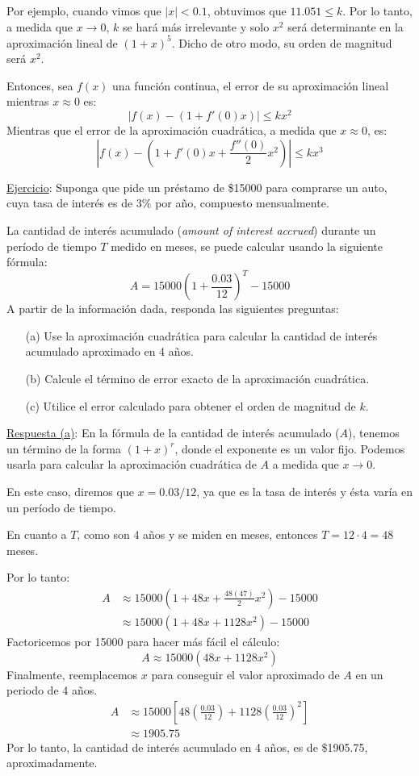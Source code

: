 \documentclass[12pt]{article}
\begin{document}
Por ejemplo, cuando vimos que $|x| < 0.1$, obtuvimos que $11.051 \leq k$. Por lo tanto, a medida que $x \to 0$, $k$ se hará más irrelevante y solo $x^{2}$ será determinante en la aproximación lineal de $(1 + x)^{5}$. Dicho de otro modo, su orden de magnitud será $x^{2}$.

Entonces, sea $f(x)$ una función continua, el error de su aproximación lineal mientras $x \approx 0$ es:
\[|f(x) - (1 + f'(0)x)| \leq kx^{2}\]
Mientras que el error de la aproximación cuadrática, a medida que $x \approx 0$, es:
\[\left|f(x) - \left(1 + f'(0)x + \frac{f''(0)}{2} x^{2}\right)\right| \leq kx^{3}\]

\underline{Ejercicio}: Suponga que pide un préstamo de \$15000 para comprarse un auto, cuya tasa de interés es de 3\% por año, compuesto mensualmente.

La cantidad de interés acumulado (\textit{amount of interest accrued}) durante un período de tiempo $T$ medido en meses, se puede calcular usando la siguiente fórmula:
\[A = 15000\left(1 + \frac{0.03}{12}\right)^{T} - 15000\]
A partir de la información dada, responda las siguientes preguntas:

\begin{itemize}
\item[(a)] Use la aproximación cuadrática para calcular la cantidad de interés acumulado aproximado en 4 años.

\item[(b)] Calcule el término de error exacto de la aproximación cuadrática.

\item[(c)] Utilice el error calculado para obtener el orden de magnitud de $k$.
\end{itemize}

\newpage

\underline{Respuesta (a)}: En la fórmula de la cantidad de interés acumulado ($A$), tenemos un término de la forma $(1 + x)^{r}$, donde el exponente es un valor fijo. Podemos usarla para calcular la aproximación cuadrática de $A$ a medida que $x \to 0$.

En este caso, diremos que $x = 0.03/12$, ya que es la tasa de interés y ésta varía en un período de tiempo.

En cuanto a $T$, como son 4 años y se miden en meses, entonces $T = 12 \cdot 4 = 48$ meses.

Por lo tanto:
\begin{align*}
A &\approx
	15000\left(1 + 48x + \frac{48(47)}{2} x^{2} \right) - 15000 \\
  &\approx 15000(1 + 48x + 1128 x^{2}) - 15000
\end{align*}
Factoricemos por 15000 para hacer más fácil el cálculo:
\[
A \approx 15000(48x + 1128x^{2})
\]
Finalmente, reemplacemos $x$ para conseguir el valor aproximado de $A$ en un periodo de 4 años.
\begin{align*}
A &\approx 15000 \left[48 \left(\frac{0.03}{12}\right) +
		   1128 \left(\frac{0.03}{12}\right)^{2}\right] \\
  &\approx 1905.75
\end{align*}
Por lo tanto, la cantidad de interés acumulado en 4 años, es de \$1905.75, aproximadamente.
\end{document}
